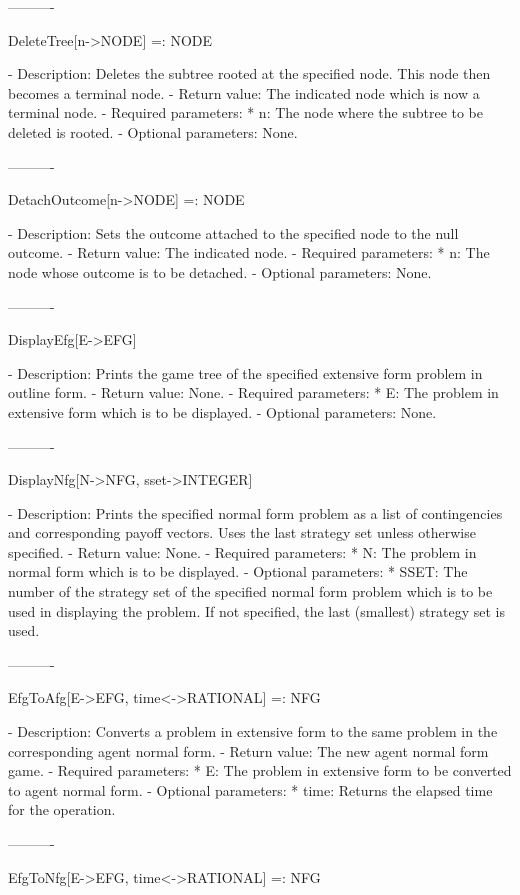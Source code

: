{----------

DeleteTree[n->NODE] =: NODE

   -	Description:  Deletes the subtree rooted at the specified node.  This 
	node then becomes a terminal node.
   -	Return value:  The indicated node which is now a terminal node.
   -	Required parameters:
	  *  n:  The node where the subtree to be deleted is rooted.
   -	Optional parameters:  None.

----------

DetachOutcome[n->NODE] =: NODE

   -	Description:  Sets the outcome attached to the specified node to the 
	null outcome.
   -	Return value:  The indicated node.
   -	Required parameters:
	  *  n:  The node whose outcome is to be detached.
   -	Optional parameters:  None.

----------

DisplayEfg[E->EFG]

   -	Description:  Prints the game tree of the specified extensive form
	problem in outline form.
   -	Return value:  None.
   -	Required parameters:
	  *  E:  The problem in extensive form which is to be displayed.
   -	Optional parameters:  None.

----------

DisplayNfg[N->NFG, {sset->INTEGER}]

   -	Description:  Prints the specified normal form problem as a list of
	contingencies and corresponding payoff vectors.  Uses the last strategy
	set unless otherwise specified.
   -	Return value:  None.
   -	Required parameters:
	  *  N:  The problem in normal form which is to be displayed.
   -	Optional parameters:
	  *  SSET:  The number of the strategy set of the specified normal form
		problem which is to be used in displaying the problem.  If not
		specified, the last (smallest) strategy set is used.

----------

EfgToAfg[E->EFG, {time<->RATIONAL}] =: NFG

   -	Description:  Converts a problem in extensive form to the same problem
	in the corresponding agent normal form.
   -	Return value:  The new agent normal form game.  
   -	Required parameters:
	  *  E:  The problem in extensive form to be converted to agent normal
		form.
   -	Optional parameters:
	  *  time:  Returns the elapsed time for the operation.

----------

EfgToNfg[E->EFG, {time<->RATIONAL}] =: NFG

}
